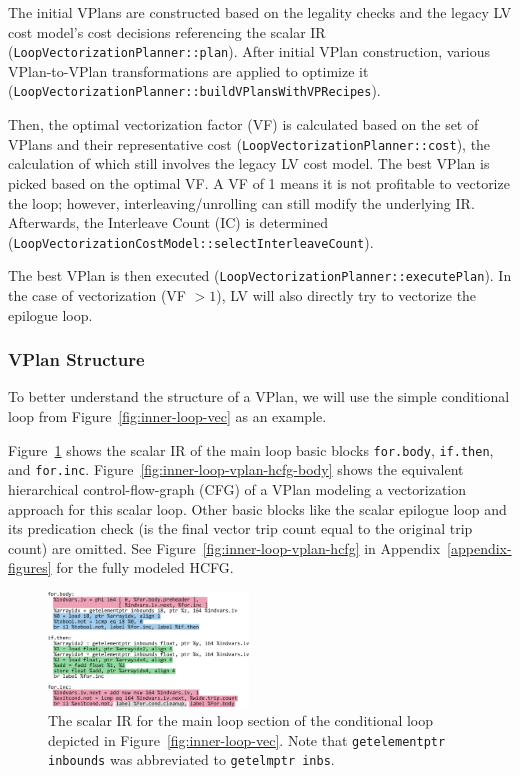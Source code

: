 \documentclass[sigplan,11pt,nonacm]{acmart}
\begin{document}
The initial VPlans are constructed based on the legality checks and the legacy LV cost model's 
cost decisions referencing the scalar IR (\texttt{LoopVectorizationPlanner::\allowbreak plan}). 
After initial VPlan construction, various VPlan-to-VPlan 
transformations are applied to optimize it 
(\texttt{LoopVectorizationPlanner::\allowbreak buildVPlansWithVPRecipes}).

Then, the optimal vectorization factor (VF) is calculated based on the set of VPlans and their 
representative cost (\texttt{LoopVectorizationPlanner::\allowbreak cost}), the calculation of 
which still involves the legacy LV cost model.
The best VPlan is picked based on the optimal VF. A VF of 1 means it is not profitable to vectorize 
the loop; however, interleaving/unrolling can still modify the underlying IR. Afterwards, the 
Interleave Count (IC) is determined 
(\texttt{LoopVectorizationCostModel::\allowbreak selectInterleaveCount}).

The best VPlan is then executed (\texttt{LoopVectorizationPlanner::\allowbreak executePlan}). In the 
case of vectorization (VF $>1$), LV will also directly try to vectorize the epilogue loop.

\subsubsection{VPlan Structure}
To better understand the structure of a VPlan, we will use the
simple conditional loop from Figure~\ref{fig:inner-loop-vec} as an example.

Figure~\ref{fig:inner-loop-scalar-ir} shows the scalar IR of the main loop basic blocks \texttt{for.body},
\texttt{if.then}, and \texttt{for.inc}. Figure~\ref{fig:inner-loop-vplan-hcfg-body} shows the equivalent
hierarchical control-flow-graph (CFG) of a VPlan modeling a vectorization approach for this 
scalar loop. Other basic blocks like the scalar epilogue loop and its predication check (is the final
vector trip count equal to the original trip count) are omitted. See Figure~\ref{fig:inner-loop-vplan-hcfg}
in Appendix~\ref{appendix-figures} for the fully modeled HCFG.


\begin{figure}
  \centering
  \includegraphics[width=0.475\textwidth]{images/inner-loop-scalar-loop-ir-color.png}
  \caption{The scalar IR for the main loop section of the conditional loop depicted in
  Figure~\ref{fig:inner-loop-vec}. Note that \texttt{getelementptr inbounds}
  was abbreviated to \texttt{getelmptr inbs}.}
  \label{fig:inner-loop-scalar-ir}
\end{figure}
\end{document}
